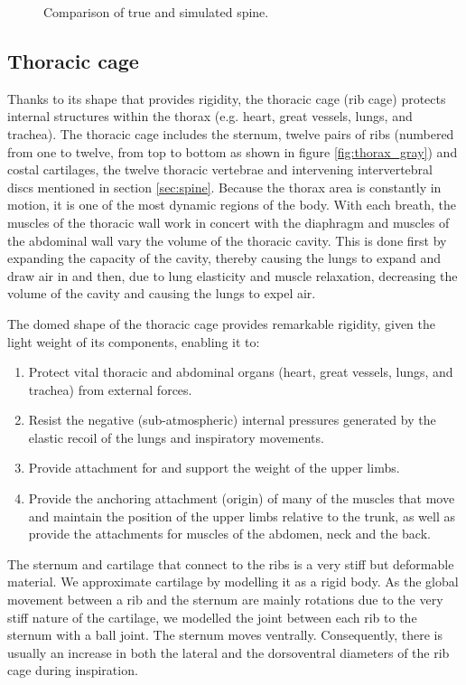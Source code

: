\begin{figure}
{\label{fig:spine_simu}
}
\caption[Comparison of true and simulated spine]{\label{fig:spine}Comparison of true and simulated spine.}
\end{figure}

\subsection{\label{sec:thoracic_cage}Thoracic cage}
Thanks to its shape that provides rigidity, the thoracic cage (rib cage) protects internal structures within the thorax (e.g. heart, great vessels, lungs, and trachea). The thoracic cage includes the sternum, twelve pairs of ribs (numbered from one to twelve, from top to bottom as shown in figure \ref{fig:thorax_gray}) and costal cartilages, the twelve thoracic vertebrae and intervening intervertebral discs mentioned in section \ref{sec:spine}. Because the thorax area is constantly in motion, it is one of the most dynamic regions of the body. With each breath, the muscles of the thoracic wall work in concert with the diaphragm and muscles of the abdominal wall vary the volume of the thoracic cavity. This is done first by expanding the capacity of the cavity, thereby causing the lungs to expand and draw air in and then, due to lung elasticity and muscle relaxation, decreasing the volume of the cavity and causing the lungs to expel air.

The domed shape of the thoracic cage provides remarkable rigidity, given the light weight of its components, enabling it to:
\begin{enumerate}
	\item Protect vital thoracic and abdominal organs (heart, great vessels, lungs, and trachea) from external forces.
	\item Resist the negative (sub-atmospheric) internal pressures generated by the elastic recoil of the lungs and inspiratory movements.
	\item Provide attachment for and support the weight of the upper limbs.
	\item Provide the anchoring attachment (origin) of many of the muscles that move and maintain the position of the upper limbs relative to the trunk, as well as provide the attachments for muscles of the abdomen, neck and the back.
\end{enumerate}	

The sternum and cartilage that connect to the ribs is a very stiff but deformable material. We approximate cartilage by modelling it as a rigid body. As the global movement between a rib and the sternum are mainly rotations due to the very stiff nature of the cartilage, we modelled the joint between each rib to the sternum with a ball joint. The sternum moves ventrally. Consequently, there is usually an increase in both the lateral and the dorsoventral diameters of the rib cage during inspiration.

